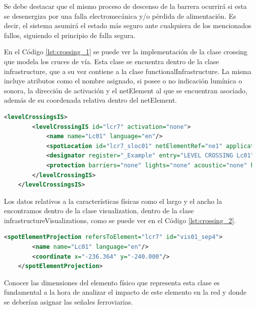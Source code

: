     Se debe destacar que el mismo proceso de descenso de la barrera ocurrirá si esta se desenergiza por una falla electromecánica y/o pérdida de alimentación. Es decir, el sistema asumirá el estado más seguro ante cualquiera de los mencionados fallos, siguiendo el principio de falla segura.

    En el Código \ref{lst:crossing_1} se puede ver la implementación de la clase crossing que modela los cruces de vía. Esta clase se encuentra dentro de la clase infrastructure, que a su vez contiene a la clase functionalInfrastructure. La misma incluye atributos como el nombre asignado, si posee o no indicación lumínica o sonora, la dirección de activación y el netElement al que se encuentran asociado, además de su coordenada relativa dentro del netElement.

    \begin{lstlisting}[language = XML, caption = Clase Platform , label = {lst:crossing_1}]
    <levelCrossingsIS>
        <levelCrossingIS id="lcr7" activation="none">
            <name name="Lc01" language="en"/>
            <spotLocation id="lcr7_sloc01" netElementRef="ne1" applicationDirection="both" intrinsicCoord="0.3145"/>
            <designator register="_Example" entry="LEVEL CROSSING Lc01"/>
            <protection barriers="none" lights="none" acoustic="none" hasActiveProtection="true"/>
        </levelCrossingIS>
    </levelCrossingsIS>
    \end{lstlisting}

	Los datos relativos a la características físicas como el largo y el ancho la encontramos dentro de la clase visualization, dentro de la clase infrastructureVisualizations, como se puede ver en el Código \ref{lst:crossing_2}.
	
    \begin{lstlisting}[language = XML, caption = Clase visualization , label = {lst:crossing_2}]
    <spotElementProjection refersToElement="lcr7" id="vis01_sep4">
        <name name="Lc01" language="en"/>
        <coordinate x="-236.364" y="-240.000"/>
    </spotElementProjection>
    \end{lstlisting}

    Conocer las dimensiones del elemento físico que representa esta clase es fundamental a la hora de analizar el impacto de este elemento en la red y donde se deberían asignar las señales ferroviarias.